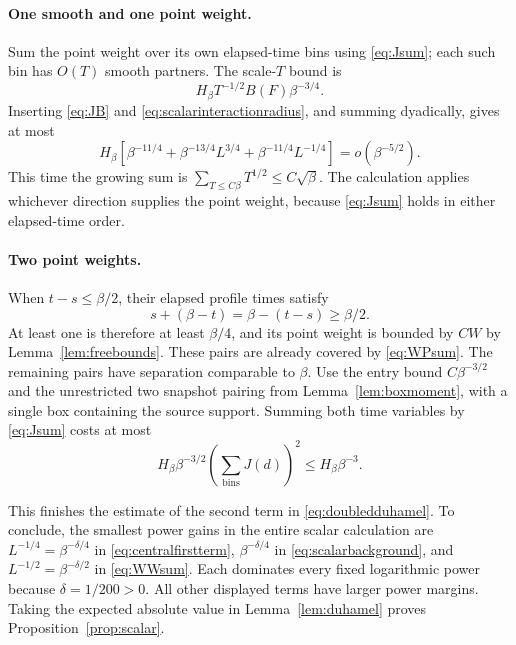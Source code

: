 \paragraph{One smooth and one point weight.}
Sum the point weight over its own elapsed-time bins using
\eqref{eq:Jsum}; each such bin has $O(T)$ smooth partners.
The scale-$T$ bound is
\[
 H_\beta T^{-1/2}B(F)\beta^{-3/4}.
\]
Inserting \eqref{eq:JB} and \eqref{eq:scalarinteractionradius},
and summing dyadically, gives at most
\begin{equation}\label{eq:WPsum}
 H_\beta\left[
  \beta^{-11/4}+\beta^{-13/4}L^{3/4}
                         +\beta^{-11/4}L^{-1/4}\right]
                           =o(\beta^{-5/2}).
\end{equation}
This time the growing sum is
$\sum_{T\le C\beta}T^{1/2}\le C\sqrt\beta$.
The calculation applies whichever direction supplies the point
weight, because \eqref{eq:Jsum} holds in either elapsed-time order.

\paragraph{Two point weights.}
When $t-s\le\beta/2$, their elapsed profile times satisfy
\[
 s+(\beta-t)=\beta-(t-s)\ge\beta/2.
\]
At least one is therefore at least $\beta/4$, and its point weight
is bounded by $CW$ by Lemma~\ref{lem:freebounds}.  These pairs are
already covered by \eqref{eq:WPsum}.  The remaining pairs have
separation comparable to $\beta$.  Use the entry bound
$C\beta^{-3/2}$ and the unrestricted two snapshot pairing from
Lemma~\ref{lem:boxmoment}, with a single box containing the source
support.  Summing both time variables by \eqref{eq:Jsum} costs at most
\begin{equation}\label{eq:PPsum}
 H_\beta\beta^{-3/2}
       \left(\sum_{\mathrm{bins}}J(d)\right)^2
                   \le H_\beta\beta^{-3}.
\end{equation}

This finishes the estimate of the second term in
\eqref{eq:doubledduhamel}.  To conclude, the smallest power gains
in the entire scalar calculation are $L^{-1/4}=\beta^{-\delta/4}$
in \eqref{eq:centralfirstterm}, $\beta^{-\delta/4}$ in
\eqref{eq:scalarbackground}, and $L^{-1/2}=\beta^{-\delta/2}$ in
\eqref{eq:WWsum}.  Each dominates every fixed logarithmic power
because $\delta=1/200>0$.  All other displayed terms have larger
power margins.  Taking the expected absolute value in
Lemma~\ref{lem:duhamel} proves Proposition~\ref{prop:scalar}.
